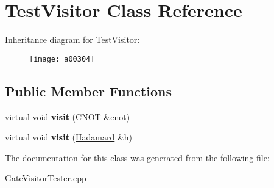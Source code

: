 \hypertarget{a00304}{}\section{Test\+Visitor Class Reference}
\label{a00304}
Inheritance diagram for Test\+Visitor\+:\begin{figure}[H]
\begin{center}
\leavevmode
\texttt{[image: a00304]}
\end{center}
\end{figure}
\subsection*{Public Member Functions}
\begin{DoxyCompactItemize}
\item 
virtual void {\bfseries visit} (\hyperlink{a00058}{C\+N\+OT} \&cnot)\hypertarget{a00304_a2766c0664632ae33300eb9e663a26005}{}\label{a00304_a2766c0664632ae33300eb9e663a26005}

\item 
virtual void {\bfseries visit} (\hyperlink{a00137}{Hadamard} \&h)\hypertarget{a00304_a0a0f77d3f19f9bda449318a52031f2d4}{}\label{a00304_a0a0f77d3f19f9bda449318a52031f2d4}

\end{DoxyCompactItemize}


The documentation for this class was generated from the following file\+:\begin{DoxyCompactItemize}
\item 
Gate\+Visitor\+Tester.\+cpp\end{DoxyCompactItemize}
